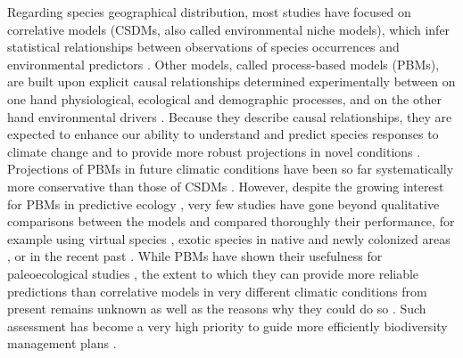 \documentclass[pdflatex, sn-nature]{sn-jnl}%
\begin{document}
Regarding species geographical distribution, most studies have focused on correlative models (CSDMs, also called environmental niche models), which infer statistical relationships between observations of species occurrences and environmental predictors \cite{Dormann2012}.  Other models, called process-based models (PBMs), are built upon explicit causal relationships determined experimentally between on one hand physiological, ecological and demographic processes, and on the other hand environmental drivers \cite{Dormann2012}. Because they describe causal relationships, they are expected to enhance our ability to understand and predict species responses to climate change and to provide more robust projections in novel conditions \cite{Evans2012, Singer2016}. Projections of PBMs in future climatic conditions have been so far systematically more conservative than those of CSDMs \cite{Morin2009, Cheaib2012, Gritti2013}. However, despite the growing interest for PBMs in predictive ecology \cite{Connolly2017, Urban2016, Pilowsky2022}, very few studies have gone beyond qualitative comparisons between the models and compared thoroughly their performance, for example using virtual species \cite{Zurell2016}, exotic species in native and newly colonized areas \cite{Higgins2020}, or in the recent past \cite{Fordham2018}. While PBMs have shown their usefulness for paleoecological studies \cite{Saltre2013, Ruosch2016, Schwoerer2014}, the extent to which they can provide more reliable predictions than correlative models in very different climatic conditions from present remains unknown as well as the reasons why they could do so \cite{UribeRivera2022, Briscoe2019}. Such assessment has become a very high priority to guide more efficiently biodiversity management plans \cite{Pacifici2015}.
\end{document}
